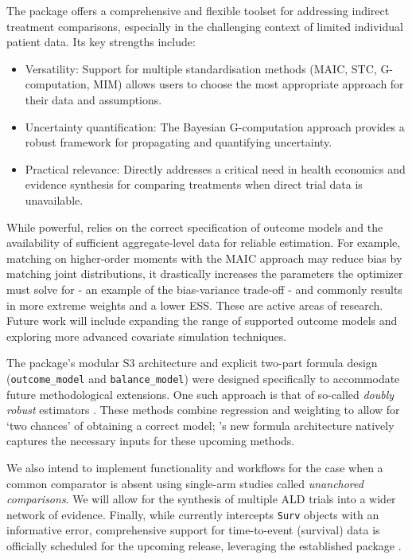 \documentclass[article]{jss}
\begin{document}
The  package offers a comprehensive and flexible toolset for addressing indirect treatment comparisons, especially in the challenging context of limited individual patient data. Its key strengths include:
\begin{itemize}
    \item Versatility: Support for multiple standardisation methods (MAIC, STC, G-computation, MIM) allows users to choose the most appropriate approach for their data and assumptions.
    \item Uncertainty quantification: The Bayesian G-computation approach provides a robust framework for propagating and quantifying uncertainty.
    \item Practical relevance: Directly addresses a critical need in health economics and evidence synthesis for comparing treatments when direct trial data is unavailable.
\end{itemize}
While powerful,  relies on the correct specification of outcome models and the availability of sufficient aggregate-level data for reliable estimation. For example, matching on higher-order moments with the MAIC approach may reduce bias by matching joint distributions, it drastically increases the parameters the optimizer must solve for - an example of the bias-variance trade-off - and commonly results in more extreme weights and a lower ESS.
These are active areas of research. Future work will include expanding the range of supported outcome models and exploring more advanced covariate simulation techniques.

The package’s modular S3 architecture and explicit two-part formula design (\texttt{outcome\_model} and \texttt{balance\_model}) were designed specifically to accommodate future methodological extensions. One such approach is that of so-called \textit{doubly robust} estimators \citep{campbell2025}. These methods combine regression and weighting to allow for `two chances' of obtaining a correct model; 's new formula architecture natively captures the necessary inputs for these upcoming methods.

We also intend to implement functionality and workflows for the case when a common comparator is absent using single-arm studies called \textit{unanchored comparisons}. We will allow for the synthesis of multiple ALD trials into a wider network of evidence. Finally, while  currently intercepts \texttt{Surv} objects with an informative error, comprehensive support for time-to-event (survival) data is officially scheduled for the upcoming release, leveraging the established  package \citep{survivalpkg}.

\end{document}
